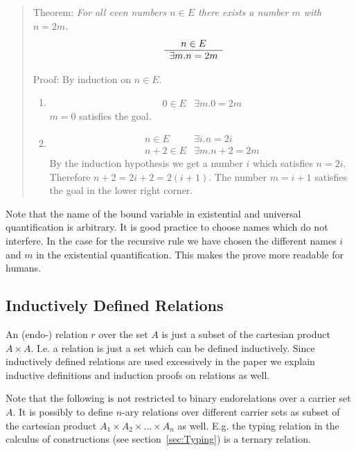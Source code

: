 \begin{quote}
    Theorem: \emph{For all even numbers $n \in E$ there exists a number $m$ with
    $n = 2m$}.
    $$
    \begin{array}{c} n \in E \\ \hline \exists m. n = 2m\end{array}
    $$

    Proof: By induction on $n \in E$.
    \begin{enumerate}
    \item
        $$
        \begin{array}{l|l}
        0 \in E
        & \exists m. 0 = 2m
        \end{array}
        $$
        $m = 0$ satisfies the goal.

    \item
        $$
        \begin{array}{l|l}
            n \in E
            &
            \exists i. n = 2i
            \\
            \hline
            n+2 \in E
            &
            \exists m. n+2 = 2m
        \end{array}
        $$
        By the induction hypothesis we get a number $i$ which satisfies $n =
        2i$. Therefore $n+2 = 2i + 2 = 2(i+1)$. The number $m = i+1$ satisfies
        the goal in the lower right corner.
    \end{enumerate}
\end{quote}


Note that the name of the bound variable in existential and universal
quantification is arbitrary. It is good practice to choose names which do not
interfere. In the case for the recursive rule we have chosen the different names
$i$ and $m$ in the existential quantification. This makes the prove more
readable for humans.







\subsection{Inductively Defined Relations}

An (endo-) relation $r$ over the set $A$ is just a subset of the cartesian
product $A \times A$. I.e. a relation is just a set which can be defined
inductively. Since inductively defined relations are used excessively in the
paper we explain inductive definitions and induction proofs on relations as
well.

Note that the following is not restricted to binary endorelations over a carrier
set $A$. It is possibly to define $n$-ary relations over different carrier sets
as subset of the cartesian product $A_1 \times A_2 \times \ldots \times A_n$ as
well. E.g. the typing relation in the calculus of constructions (see
section~\ref{sec:Typing}) is a ternary relation.

